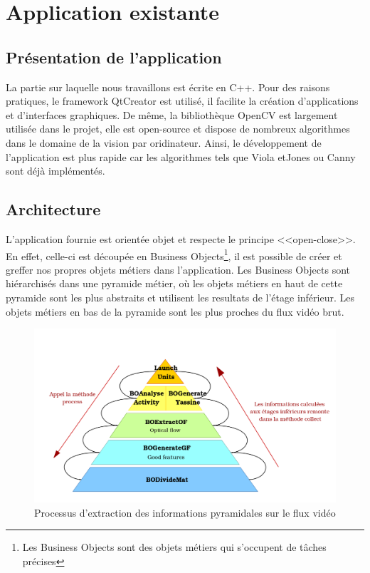 \section{Application existante}

\subsection{Présentation de l'application}
La partie sur laquelle nous travaillons est écrite en C++. Pour des raisons pratiques, le framework 
QtCreator est utilisé, il facilite la création d'applications et d'interfaces graphiques. De même, 
la bibliothèque OpenCV  est largement utilisée dans le projet, elle est open-source et dispose de 
nombreux algorithmes dans le domaine de la vision par oridinateur. Ainsi, le développement de 
l'application est plus rapide car les algorithmes tels que Viola etJones ou Canny sont déjà implémentés.\\

\subsection{Architecture}
L'application fournie est orientée objet et respecte le principe <<open-close>>. En effet, celle-ci est 
découpée en Business Objects\footnote{Les Business Objects sont des objets métiers qui s'occupent de tâches 
précises}, il est possible de créer et greffer nos propres objets métiers dans l'application. Les Business 
Objects sont hiérarchisés dans une pyramide métier, où les objets métiers en haut de cette pyramide 
sont les plus abstraits et utilisent les resultats de l'étage inférieur. Les objets métiers en bas de 
la pyramide sont les plus proches du flux vidéo brut.\\

\begin{figure}[H]
  \centering
  \includegraphics[width=12.5cm]{image/pyramide.png}
  \caption{Processus d'extraction des informations pyramidales sur le flux vidéo}
\end{figure}

